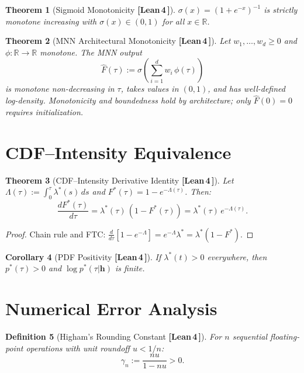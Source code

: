 \documentclass[11pt]{article}
\newtheorem{theorem}{Theorem}[section]
\newtheorem{corollary}[theorem]{Corollary}
\newtheorem{definition}[theorem]{Definition}
\theoremstyle{remark}
\newcommand{\verified}{%
  \textcolor{green!60!black}{\textbf{[Lean\,4\,\checkmark]}}}
\newcommand{\R}{\mathbb{R}}
\newcommand{\hhat}{\boldsymbol{h}}
\newcommand{\sigmoid}{\sigma}
\begin{document}
\begin{theorem}[Sigmoid Monotonicity \verified{}]
\label{thm:sigmoid}
$\sigmoid(x) = (1+e^{-x})^{-1}$ is strictly monotone increasing with
$\sigmoid(x) \in (0,1)$ for all $x \in \R$.
\end{theorem}

\begin{theorem}[MNN Architectural Monotonicity \verified{}]
\label{thm:mnn-mono}
Let $w_1,\ldots,w_d \geq 0$ and $\phi : \R \to \R$ monotone.  The MNN output
\[
  \hat{F}(\tau)
  := \sigmoid\!\left(\sum_{i=1}^d w_i\,\phi(\tau)\right)
\]
is monotone non-decreasing in $\tau$, takes values in $(0,1)$, and has
well-defined log-density.  Monotonicity and boundedness hold by architecture;
only $\hat{F}(0)=0$ requires initialization.
\end{theorem}

\section{CDF--Intensity Equivalence}

\begin{theorem}[CDF--Intensity Derivative Identity \verified{}]
\label{thm:cdf-intensity}
Let $\Lambda(\tau) := \int_0^\tau \lambda^*(s)\,ds$ and
$F^*(\tau) = 1 - e^{-\Lambda(\tau)}$.  Then:
\[
  \frac{dF^*(\tau)}{d\tau}
  = \lambda^*(\tau)\,(1 - F^*(\tau))
  = \lambda^*(\tau)\,e^{-\Lambda(\tau)}.
\]
\end{theorem}

\begin{proof}
Chain rule and FTC:
$\frac{d}{d\tau}[1 - e^{-\Lambda}] = e^{-\Lambda}\lambda^*
= \lambda^*(1-F^*)$.
\end{proof}

\begin{corollary}[PDF Positivity \verified{}]
If $\lambda^*(t) > 0$ everywhere, then $p^*(\tau) > 0$ and
$\log p^*(\tau|\hhat)$ is finite.
\end{corollary}

\section{Numerical Error Analysis}

\begin{definition}[Higham's Rounding Constant \verified{}]
For $n$ sequential floating-point operations with unit roundoff $u < 1/n$:
\[
  \gamma_n := \frac{nu}{1-nu} > 0.
\]
\end{definition}
\end{document}
